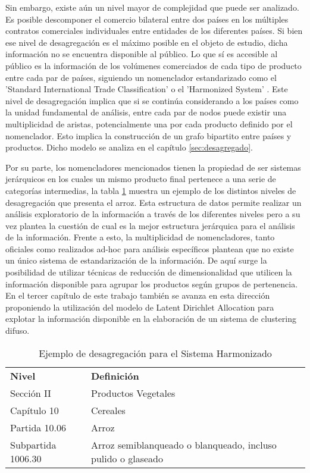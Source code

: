\documentclass[class=article, crop=false]{standalone}
\begin{document}
Sin embargo, existe aún un nivel mayor de complejidad que puede ser analizado. Es posible descomponer el comercio bilateral entre dos países en los múltiples contratos comerciales individuales entre entidades de los diferentes países. Si bien ese nivel de desagregación es el máximo posible en el objeto de estudio, dicha información no se encuentra disponible al público. Lo que sí es accesible al público es la información de los volúmenes comerciados de cada tipo de producto entre cada par de países, siguiendo un nomenclador estandarizado como el 'Standard International Trade Classification' \citep{un2006standard} o el 'Harmonized System' \citep{weerth2008basic}. 
Este nivel de desagregación implica que si se continúa considerando a los países como la unidad fundamental de análisis, entre cada par de nodos puede existir una multiplicidad de aristas, potencialmente una por cada producto definido por el nomenclador. Esto implica la construcción de un grafo bipartito entre países y productos. Dicho modelo se analiza en el capítulo \ref{sec:desagregado}. 

Por su parte, los nomencladores mencionados tienen la propiedad de ser sistemas jerárquicos en los cuales un mismo producto final pertenece a una serie de categorías intermedias, la tabla  \ref{table:ejemplo-hs} muestra un ejemplo de los distintos niveles de desagregación que presenta el arroz. Esta estructura de datos permite realizar un análisis exploratorio de la información a través de los diferentes niveles pero a su vez plantea la cuestión de cual es la mejor estructura jerárquica para el análisis de la información. Frente a esto, la multiplicidad de nomencladores, tanto oficiales como realizados ad-hoc para análisis específicos \citep{molinari2016especializacion} plantean que no existe un único sistema de estandarización de la información. De aquí surge la posibilidad de utilizar técnicas de reducción de dimensionalidad que utilicen la información disponible para agrupar los productos según grupos de pertenencia. En el tercer capítulo de este trabajo también se avanza en esta dirección proponiendo la utilización del modelo de Latent Dirichlet Allocation \citep{blei2003latent} para explotar la información disponible en la elaboración de un sistema de clustering difuso. 

\begin{table}[]
	\begin{tabular}{ll}
		\textbf{Nivel}     & \textbf{Definición}                                          \\
		Sección II         & Productos Vegetales                                          \\
		Capítulo 10        & Cereales                                                     \\
		Partida 10.06      & Arroz                                                        \\
		Subpartida 1006.30 & Arroz semiblanqueado o blanqueado, incluso pulido o glaseado
	\end{tabular}
	\caption{Ejemplo de desagregación para el Sistema Harmonizado}
	\label{table:ejemplo-hs}
\end{table}
\end{document}
